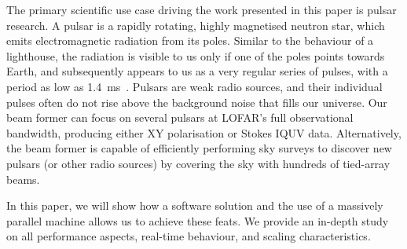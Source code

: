 \documentclass{llncs}
\begin{document}
The primary scientific use case driving the work presented in this paper is pulsar research. A pulsar is a rapidly rotating, highly magnetised neutron star, which emits electromagnetic radiation from its poles. Similar to the behaviour of a lighthouse, the radiation is visible to us only if one of the poles points towards Earth, and subsequently appears to us as a very regular series of pulses, with a period as low as 1.4~ms~\cite{Hessels:06}. Pulsars are weak radio sources, and their individual pulses often do not rise above the background noise that fills our universe. Our beam former can focus on several pulsars at LOFAR's full observational bandwidth, producing either XY polarisation or Stokes IQUV data. Alternatively, the beam former is capable of efficiently performing sky surveys to discover new pulsars (or other radio sources) by covering the sky with hundreds of tied-array beams.




In this paper, we will show how a software solution and the use of a massively parallel machine allows us to achieve these feats. We provide an in-depth study on all performance aspects, real-time behaviour, and scaling characteristics.
\end{document}
